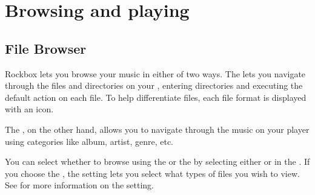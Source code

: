 \chapter{Browsing and playing}
\section{\label{ref:file_browser}File Browser}
Rockbox lets you browse your music in either of two ways. The
 lets you navigate through the files and directories on
your \dap, entering directories and executing the default action on each file.
To help differentiate files, each file format is displayed with an icon.

The , on the other hand, allows you to navigate
through the music on your player using categories like album, artist, genre,
etc.

You can select whether to browse using the  or the
 by selecting either  or
 in the .
If you choose the , the  setting
lets you select what types of files you wish to view. See
 for more information on the 
setting.



